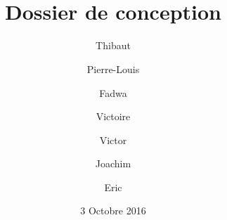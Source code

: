 \documentclass{article}
\title{\bsc{PLD Agile} \\ Dossier de conception}
\author{Thibaut \bsc{Fernandez} \and Pierre-Louis \bsc{Lefebvre} \and Fadwa \bsc{Messaoudi} \and Victoire \bsc{Chapelle} \and Victor \bsc{Capelle} \and Joachim \bsc{Dorel} \and Eric \bsc{Jordan}}
\date{3 Octobre 2016}
\begin{document}
\maketitle
\tableofcontents



\glsDisplay
\end{document}
